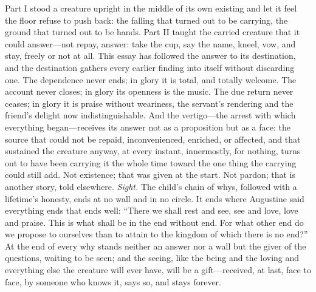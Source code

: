 Part I stood a creature upright in the middle of its own existing and let it feel the floor refuse to push back: the falling that turned out to be carrying, the ground that turned out to be hands. Part II taught the carried creature that it could answer---not repay, answer: take the cup, say the name, kneel, vow, and stay, freely or not at all. This essay has followed the answer to its destination, and the destination gathers every earlier finding into itself without discarding one. The dependence never ends; in glory it is total, and totally welcome. The account never closes; in glory its openness is the music. The due return never ceases; in glory it is praise without weariness, the servant's rendering and the friend's delight now indistinguishable. And the vertigo---the arrest with which everything began---receives its answer not as a proposition but as a face: the source that could not be repaid, inconvenienced, enriched, or affected, and that sustained the creature anyway, at every instant, innermostly, for nothing, turns out to have been carrying it the whole time toward the one thing the carrying could still add. Not existence; that was given at the start. Not pardon; that is another story, told elsewhere. \emph{Sight.} The child's chain of whys, followed with a lifetime's honesty, ends at no wall and in no circle. It ends where Augustine said everything ends that ends well: ``There we shall rest and see, see and love, love and praise. This is what shall be in the end without end. For what other end do we propose to ourselves than to attain to the kingdom of which there is no end?'' At the end of every why stands neither an answer nor a wall but the giver of the questions, waiting to be seen; and the seeing, like the being and the loving and everything else the creature will ever have, will be a gift---received, at last, face to face, by someone who knows it, says so, and stays forever.
